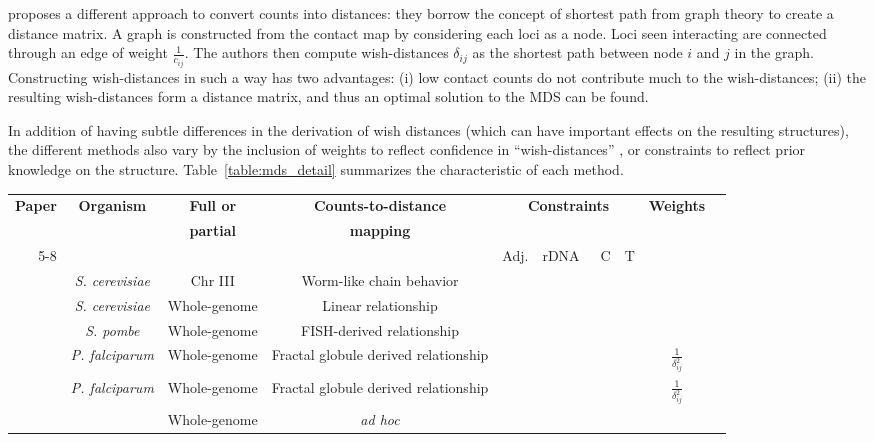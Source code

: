 \documentclass[letterpaper,12pt]{article}
\newcommand*\CHECK{\ding{51}}
\begin{document}
\citet{lesne:3d} proposes a different approach to convert counts into
distances: they borrow the concept of shortest path from graph theory to
create a distance matrix. A graph is constructed from the contact map by
considering each loci as a node. Loci seen interacting are connected through
an edge of weight $\frac{1}{c_{ij}}$. The authors then compute wish-distances
$\delta_{ij}$ as the shortest path between node $i$ and $j$ in the graph.
Constructing wish-distances in such a way has two advantages: (i) low contact
counts do not contribute much to the wish-distances; (ii) the resulting
wish-distances form a distance matrix, and thus an optimal solution to the MDS
can be found.

In addition of having subtle differences in the derivation of wish distances
(which can have important effects on the resulting structures),
the different methods also vary by the inclusion of weights to reflect
confidence in ``wish-distances'' \citep{ay:three-dimensional}, or constraints
to reflect prior knowledge on the structure. Table~\ref{table:mds_detail}
summarizes the characteristic of each method.

\begin{table*}
\scriptsize
\centering
\begin{tabular}{rccccccccc}
\hline
\multirow{2}{*}{\textbf{Paper}} & \multirow{2}{*}{\textbf{Organism}} &
\textbf{Full or}
& \textbf{Counts-to-distance} &
\multicolumn{4}{c}{\multirow{2}{*}{\textbf{Constraints}}}
& \multirow{2}{*}{\textbf{Weights}}\\
 & & \textbf{partial} & \textbf{mapping} &  \\
 \cmidrule(lr){5-8} 
 & & & & Adj. & rDNA & C & T & \\
\hline
\cite{dekker:capturing} & {\em S. cerevisiae} & Chr III & Worm-like chain
behavior & & & & \\
\cite{duan:three-dimensional} & {\em S. cerevisiae} & Whole-genome & Linear
relationship & \CHECK &  \CHECK & \CHECK &  & \\
\cite{tanizawa:mapping} & {\em S. pombe} & Whole-genome &
FISH-derived relationship & \CHECK & \CHECK & \CHECK & \CHECK &  \\
\cite{ay:three-dimensional} & {\em P. falciparum} & Whole-genome & Fractal
globule derived relationship & \CHECK  & & &
& $\frac{1}{\delta_{ij}^2}$ \\
\cite{peng:sequencing} & {\em P. falciparum} & Whole-genome & Fractal
globule derived relationship & \CHECK  & & &
 & $\frac{1}{\delta_{ij}^2}$ \\
\cite{lesne:3d} & & Whole-genome & \textit{ad hoc} & & & & & \
\end{tabular}
\caption{Differences between MDS-based methods}{}
\label{table:mds_detail}
\end{table*}
\end{document}
